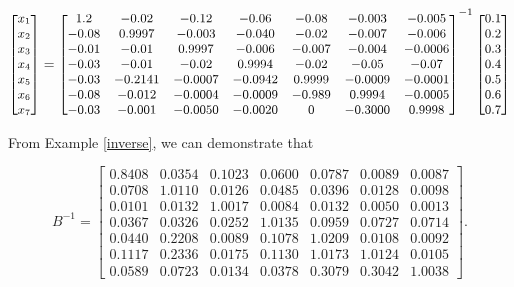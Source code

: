 \begin{example}
\[\small
\begin{bmatrix}
    x_1 \\
    x_2 \\
    x_3 \\
    x_4 \\
    x_5 \\
    x_6 \\
    x_7
\end{bmatrix}
=
\begin{bmatrix}
  1.2 & -0.02 & -0.12 & -0.06 & -0.08 & -0.003 & -0.005\\
 -0.08 & 0.9997 & -0.003 & -0.040 & -0.02 & -0.007 & -0.006 \\
 -0.01 & -0.01 & 0.9997 & -0.006 & -0.007 & -0.004 & -0.0006 \\
 -0.03 & -0.01 & -0.02 & 0.9994 & -0.02 & -0.05 & -0.07 \\
 -0.03 & -0.2141 & -0.0007 & -0.0942 & 0.9999 & -0.0009 & -0.0001 \\
 -0.08 & -0.012 & -0.0004 & -0.0009 & -0.989 & 0.9994 & -0.0005 \\
  -0.03 & -0.001 & -0.0050 & -0.0020 & 0 & -0.3000 & 0.9998
\end{bmatrix}^{-1}
\begin{bmatrix}
    0.1 \\
    0.2 \\
    0.3 \\
    0.4 \\
    0.5 \\
    0.6 \\
    0.7
\end{bmatrix}
\]

From Example \ref{inverse}, we can demonstrate that

\[
B^{-1} =
\begin{bmatrix}
    0.8408 & 0.0354 & 0.1023 & 0.0600 & 0.0787 & 0.0089 & 0.0087 \\
    0.0708 & 1.0110 & 0.0126 & 0.0485 & 0.0396 & 0.0128 & 0.0098 \\
    0.0101 & 0.0132 & 1.0017 & 0.0084 & 0.0132 & 0.0050 & 0.0013 \\
    0.0367 & 0.0326 & 0.0252 & 1.0135 & 0.0959 & 0.0727 & 0.0714 \\
    0.0440 & 0.2208 & 0.0089 & 0.1078 & 1.0209 & 0.0108 & 0.0092 \\
    0.1117 & 0.2336 & 0.0175 & 0.1130 & 1.0173 & 1.0124 & 0.0105 \\
    0.0589 & 0.0723 & 0.0134 & 0.0378 & 0.3079 & 0.3042 & 1.0038
\end{bmatrix}.
\]


\end{example}
